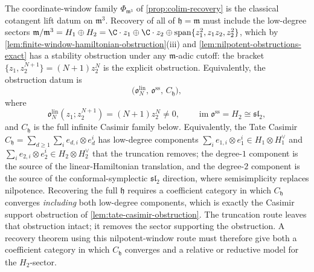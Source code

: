 \begin{thm}
\label{thm:colim-obstruction-full-h}
The coordinate-window family
  $\Phi_{\mathfrak m^3}$ of \ref{prop:colim-recovery} is the
  classical cotangent lift datum on $\mathfrak m^3$. Recovery of all of
$\mathfrak h=\mathfrak m$ must
include the low-degree sectors
$\mathfrak m/\mathfrak m^3=H_1\oplus H_2=\C\cdot z_1\oplus
\C\cdot z_2\oplus\mathrm{span}\{z_1^2,z_1z_2,z_2^2\}$, which by
\ref{lem:finite-window-hamiltonian-obstruction}(iii) and
\ref{lem:nilpotent-obstructions-exact} has a stability obstruction under
any $\mathfrak m$-adic cutoff: the bracket
$\{z_1,z_2^{N+1}\}=(N+1)z_2^N$ is the explicit obstruction.
Equivalently, the obstruction datum is
\[
  \bigl(\mathfrak o^{\mathrm{lin}}_N,\,
    \mathfrak o^{\mathrm{ss}},\,
    C_{\mathfrak h}\bigr),
\]
where
\[
  \mathfrak o^{\mathrm{lin}}_N(z_1;z_2^{N+1})
    =(N+1)z_2^N\neq0,\qquad
  \operatorname{im}\mathfrak o^{\mathrm{ss}}=H_2\cong\mathfrak{sl}_2,
\]
and \(C_{\mathfrak h}\) is the full infinite Casimir family below.
Equivalently, the Tate Casimir
$C_{\mathfrak h}=\sum_{d\geq 1}\sum_i e_{d,i}\otimes e_d^i$ has
low-degree components
$\sum_i e_{1,i}\otimes e_1^i\in H_1\otimes H_1^\vee$ and
$\sum_i e_{2,i}\otimes e_2^i\in H_2\otimes H_2^\vee$
that the truncation removes; the degree-$1$ component is the source
of the linear-Hamiltonian translation, and the degree-$2$ component
is the source of the conformal-symplectic $\mathfrak{sl}_2$ direction,
where semisimplicity replaces nilpotence. Recovering the full
$\mathfrak h$ requires a coefficient category in which
$C_{\mathfrak h}$ converges \emph{including} both low-degree
components, which is exactly the Casimir support obstruction of
\ref{lem:tate-casimir-obstruction}. The truncation route leaves that
obstruction intact; it removes the sector supporting the
obstruction.  A recovery theorem using this nilpotent-window route must
therefore give
both a coefficient category in which \(C_{\mathfrak h}\) converges and a
relative or reductive model for the \(H_2\)-sector.
\end{thm}

